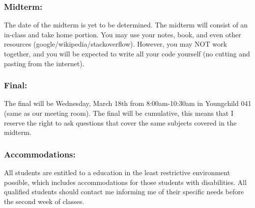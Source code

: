 \documentclass[10pt]{article}
\begin{document}
\vspace{-0.1cm}
\subsubsection*{Midterm:}
The date of the midterm is yet to be determined. The midterm will consist of an in-class and take home portion. You may use your notes, book, and even other resources (google/wikipedia/stackoverflow). However, you may NOT work together, and you will be expected to write all your code yourself (no cutting and pasting from the internet).

\vspace{-0.1cm}
\subsubsection*{Final:}
The final will be Wednesday, March 18th from 8:00am-10:30am in Youngchild 041 (same as our meeting room). The final will be cumulative, this means that I reserve the right to ask questions that cover the same subjects covered in the midterm.

\vspace{-0.1cm}
\subsubsection*{Accommodations:} All students are entitled to a education in the least restrictive environment possible, which includes accommodations for those students with disabilities. All qualified students should contact me informing me of their specific needs before the second week of classes.
\end{document}
